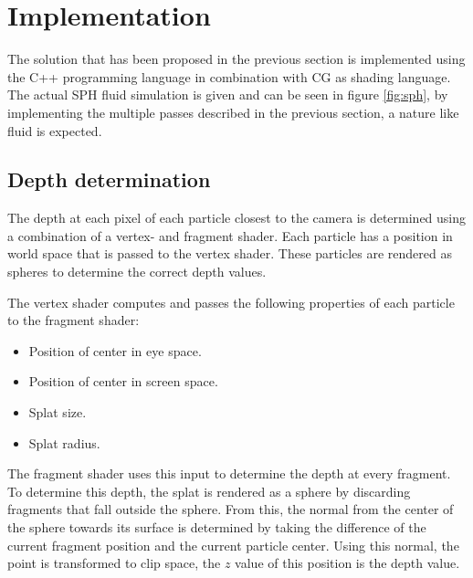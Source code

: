 \section{Implementation}
The solution that has been proposed in the previous section is implemented using the C++ programming language in combination with CG as shading language.
The actual SPH fluid simulation is given and can be seen in figure \ref{fig:sph}, by implementing the multiple passes described in the previous section, a nature like fluid is expected.

\subsection{Depth determination}
The depth at each pixel of each particle closest to the camera is determined using a combination of a vertex- and fragment shader.
Each particle has a position in world space that is passed to the vertex shader.
These particles are rendered as spheres to determine the correct depth values.

The vertex shader computes and passes the following properties of each particle to the fragment shader:
\begin{itemize}
 	\item Position of center in eye space.
 	\item Position of center in screen space.
 	\item Splat size.
 	\item Splat radius.
 \end{itemize} 

The fragment shader uses this input to determine the depth at every fragment.
To determine this depth, the splat is rendered as a sphere by discarding fragments that fall outside the sphere.
From this, the normal from the center of the sphere towards its surface is determined by taking the difference of the current fragment position and the current particle center.
Using this normal, the point is transformed to clip space, the $z$ value of this position is the depth value.

